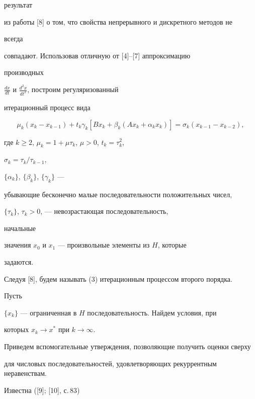 результат


из работы [8] о том, что свойства непрерывного и дискретного методов не


всегда


совпадают. Использовав отличную от [4]--[7] аппроксимацию


производных


$\frac{dx}{dt}$ и $\frac{d^2x}{dt^2}$, построим регуляризованный


итерационный процесс вида


\begin{equation}\label {3}


\mu_k(x_k-x_{k-1})+t_k\gamma_k[Bx_k+\beta_k(Ax_k+\alpha


_kx_k)]=\sigma_k


(x_{k-1}-x_{k-2}),


\end{equation}


где $k \geq 2$, $\mu_k=1+\mu \tau_k$, $\mu >0$, $t_k=\tau_k^2$,


$\sigma_k=\tau_k/\tau_{k-1}$,


$\{\alpha_k\}$, $\{\beta_k\}$, $\{\gamma_k\}$ ---


убывающие бесконечно малые последовательности положительных чисел,


$\{\tau_k\}$, $\tau_k >0$, --- невозрастающая последовательность,


начальные


значения $x_0$ и $x_1$ --- произвольные элементы из $H$, которые


задаются.





Следуя [8], будем называть (3) итерационным процессом второго порядка.


Пусть


$\{x_k\}$ --- ограниченная в $H$ последовательность. Найдем условия, при


которых $x_k \rightarrow x^*$ при $k \rightarrow \infty$.





Приведем вспомогательные утверждения, позволяющие получить оценки сверху


для числовых последовательностей, удовлетворяющих рекуррентным неравенствам.





Известна ([9]; [10], с.\,83)





